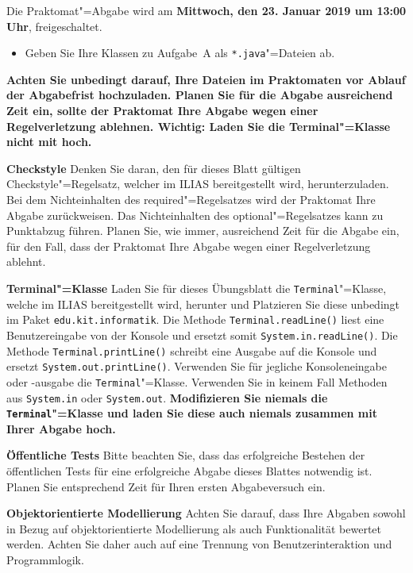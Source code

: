 Die Praktomat"=Abgabe wird am \textbf{Mittwoch, den 23. Januar 2019 um 13:00 Uhr}, freigeschaltet.

\begin{itemize}
	\item Geben Sie Ihre Klassen zu Aufgabe~A als \texttt{*.java}"=Dateien ab.
\end{itemize}
\textbf{Achten Sie unbedingt darauf, Ihre Dateien im Praktomaten vor Ablauf der Abgabefrist hochzuladen. Planen Sie für die Abgabe ausreichend Zeit ein, sollte der Praktomat Ihre Abgabe wegen einer Regelverletzung ablehnen. Wichtig: Laden Sie die Terminal"=Klasse nicht mit hoch.}


\begin{tcolorbox}
	\textbf{Checkstyle}
	\newline Denken Sie daran, den für dieses Blatt gültigen Checkstyle"=Regelsatz, welcher im ILIAS bereitgestellt wird, herunterzuladen.
	Bei dem Nichteinhalten des required"=Regelsatzes wird der Praktomat Ihre Abgabe zurückweisen.
	Das Nichteinhalten des optional"=Regelsatzes kann zu Punktabzug führen.
	Planen Sie, wie immer, ausreichend Zeit für die Abgabe ein, für den Fall, dass der Praktomat Ihre Abgabe wegen einer Regelverletzung ablehnt.
\end{tcolorbox}

\begin{tcolorbox}
	\textbf{Terminal"=Klasse}
	\newline Laden Sie für dieses Übungsblatt die \texttt{Terminal}"=Klasse, welche im ILIAS bereitgestellt wird, herunter und Platzieren Sie diese unbedingt im Paket \texttt{edu.kit.informatik}.
	Die Methode \texttt{Terminal.readLine()} liest eine Benutzereingabe von der Konsole und ersetzt somit \texttt{System.in.readLine()}.
	Die Methode \texttt{Terminal.printLine()} schreibt eine Ausgabe auf die Konsole und ersetzt \texttt{System.out.printLine()}.
	Verwenden Sie für jegliche Konsoleneingabe oder -ausgabe die \texttt{Terminal}"=Klasse.
	Verwenden Sie in keinem Fall Methoden aus \texttt{System.in} oder \texttt{System.out}.
	\textbf{Modifizieren Sie niemals die \texttt{Terminal}"=Klasse und laden Sie diese auch niemals zusammen mit Ihrer Abgabe hoch.}
\end{tcolorbox}

\begin{tcolorbox}
	\textbf{Öffentliche Tests}
	\newline Bitte beachten Sie, dass das erfolgreiche Bestehen der öffentlichen Tests für eine erfolgreiche Abgabe dieses Blattes notwendig ist. Planen Sie entsprechend Zeit für Ihren ersten Abgabeversuch ein.
\end{tcolorbox}

\begin{tcolorbox}
	\textbf{Objektorientierte Modellierung}
	\newline Achten Sie darauf, dass Ihre Abgaben sowohl in Bezug auf objektorientierte Modellierung als auch Funktionalität bewertet werden. Achten Sie daher auch auf eine Trennung von Benutzerinteraktion und Programmlogik.
\end{tcolorbox}
